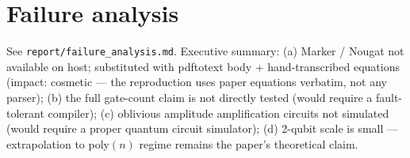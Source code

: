 \documentclass[11pt]{article}
\begin{document}
\section{Failure analysis}
See \texttt{report/failure\_analysis.md}. Executive summary: (a) Marker /
Nougat not available on host; substituted with pdftotext body +
hand-transcribed equations (impact: cosmetic — the reproduction uses paper
equations verbatim, not any parser); (b) the full gate-count claim is not
directly tested (would require a fault-tolerant compiler); (c) oblivious
amplitude amplification circuits not simulated (would require a proper
quantum circuit simulator); (d) 2-qubit scale is small — extrapolation to
poly$(n)$ regime remains the paper's theoretical claim.
\end{document}
